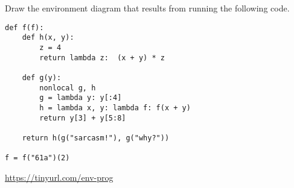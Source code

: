 \begin{blocksection}
\question Draw the environment diagram that results from running the following code.
\begin{lstlisting}
def f(f):
    def h(x, y):
        z = 4
        return lambda z:  (x + y) * z
  
    def g(y):
        nonlocal g, h
        g = lambda y: y[:4]
        h = lambda x, y: lambda f: f(x + y)
        return y[3] + y[5:8]

    return h(g("sarcasm!"), g("why?"))

f = f("61a")(2)
\end{lstlisting}

\begin{solution}[1in]
\url{https://tinyurl.com/env-prog}
\end{solution}
\end{blocksection}

